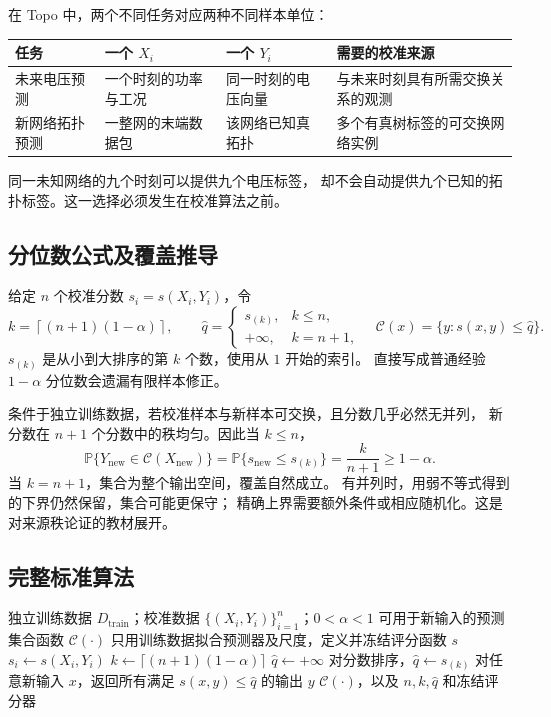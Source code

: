 在 Topo 中，两个不同任务对应两种不同样本单位：
\begin{center}
\begin{tabularx}{\linewidth}{lXXX}
\toprule
任务 & 一个 $X_i$ & 一个 $Y_i$ & 需要的校准来源\\
\midrule
未来电压预测 & 一个时刻的功率与工况 & 同一时刻的电压向量 & 与未来时刻具有所需交换关系的观测\\
新网络拓扑预测 & 一整网的末端数据包 & 该网络已知真拓扑 & 多个有真树标签的可交换网络实例\\
\bottomrule
\end{tabularx}
\end{center}
同一未知网络的九个时刻可以提供九个电压标签，
却不会自动提供九个已知的拓扑标签。这一选择必须发生在校准算法之前。

\subsection{分位数公式及覆盖推导}

给定 $n$ 个校准分数 $s_i=s(X_i,Y_i)$，令
\begin{equation}
 k=\left\lceil(n+1)(1-\alpha)\right\rceil,\qquad
 \widehat q=
 \begin{cases}
 s_{(k)},& k\le n,\\
 +\infty,& k=n+1,
 \end{cases}
 \quad
 \mathcal C(x)=\{y:s(x,y)\le\widehat q\}.
 \label{eq:textbook-S17-quantile}
\end{equation}
$s_{(k)}$ 是从小到大排序的第 $k$ 个数，使用从 $1$ 开始的索引。
直接写成普通经验 $1-\alpha$ 分位数会遗漏有限样本修正。

条件于独立训练数据，若校准样本与新样本可交换，且分数几乎必然无并列，
新分数在 $n+1$ 个分数中的秩均匀。因此当 $k\le n$，
\[
 \mathbb P\{Y_{\mathrm{new}}\in\mathcal C(X_{\mathrm{new}})\}
 =\mathbb P\{s_{\mathrm{new}}\le s_{(k)}\}
 =\frac{k}{n+1}\ge1-\alpha.
\]
当 $k=n+1$，集合为整个输出空间，覆盖自然成立。
有并列时，用弱不等式得到的下界仍然保留，集合可能更保守；
精确上界需要额外条件或相应随机化。这是对来源秩论证的教材展开。

\subsection{完整标准算法}

\begin{algorithm}[htbp]
\caption{S17：split conformal（原算法的索引与边界显式整理）}
\label{alg:textbook-S17}
\begin{algorithmic}[1]
\Require 独立训练数据 $D_{\mathrm{train}}$；校准数据 $\{(X_i,Y_i)\}_{i=1}^n$；$0<\alpha<1$
\Ensure 可用于新输入的预测集合函数 $\mathcal C(\cdot)$
\State 只用训练数据拟合预测器及尺度，定义并冻结评分函数 $s$
  \State $s_i\gets s(X_i,Y_i)$
\EndFor
\State $k\gets\lceil(n+1)(1-\alpha)\rceil$
  \State $\widehat q\gets+\infty$
\Else
  \State 对分数排序，$\widehat q\gets s_{(k)}$
\EndIf
\State 对任意新输入 $x$，返回所有满足 $s(x,y)\le\widehat q$ 的输出 $y$
\State \Return $\mathcal C(\cdot)$，以及 $n,k,\widehat q$ 和冻结评分器
\end{algorithmic}
\end{algorithm}

